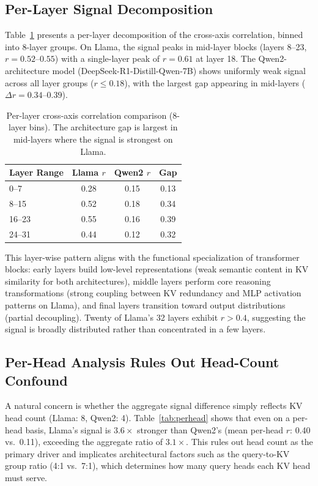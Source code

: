 \documentclass[11pt,a4paper]{article}
\begin{document}
\subsection{Per-Layer Signal Decomposition}

Table~\ref{tab:perlayer} presents a per-layer decomposition of the cross-axis correlation, binned into 8-layer groups.
On Llama, the signal peaks in mid-layer blocks (layers 8--23, $r{=}0.52$--$0.55$) with a single-layer peak of $r{=}0.61$ at layer 18.
The Qwen2-architecture model (DeepSeek-R1-Distill-Qwen-7B) shows uniformly weak signal across all layer groups ($r{\le}0.18$), with the largest gap appearing in mid-layers ($\Delta r{=}0.34$--$0.39$).

\begin{table}[t]
\centering
\small
\begin{tabular}{lccc}
\toprule
\textbf{Layer Range} & \textbf{Llama $r$} & \textbf{Qwen2 $r$} & \textbf{Gap} \\
\midrule
0--7   & 0.28 & 0.15 & 0.13 \\
8--15  & 0.52 & 0.18 & 0.34 \\
16--23 & 0.55 & 0.16 & 0.39 \\
24--31 & 0.44 & 0.12 & 0.32 \\
\bottomrule
\end{tabular}
\caption{Per-layer cross-axis correlation comparison (8-layer bins). The architecture gap is largest in mid-layers where the signal is strongest on Llama.}
\label{tab:perlayer}
\end{table}

This layer-wise pattern aligns with the functional specialization of transformer blocks: early layers build low-level representations (weak semantic content in KV similarity for both architectures), middle layers perform core reasoning transformations (strong coupling between KV redundancy and MLP activation patterns on Llama), and final layers transition toward output distributions (partial decoupling).
Twenty of Llama's 32 layers exhibit $r{>}0.4$, suggesting the signal is broadly distributed rather than concentrated in a few layers.

\subsection{Per-Head Analysis Rules Out Head-Count Confound}

A natural concern is whether the aggregate signal difference simply reflects KV head count (Llama: 8, Qwen2: 4).
Table~\ref{tab:perhead} shows that even on a per-head basis, Llama's signal is $3.6\times$ stronger than Qwen2's (mean per-head $r$: 0.40 vs.\ 0.11), exceeding the aggregate ratio of $3.1\times$.
This rules out head count as the primary driver and implicates architectural factors such as the query-to-KV group ratio (4:1 vs.\ 7:1), which determines how many query heads each KV head must serve.
\end{document}
